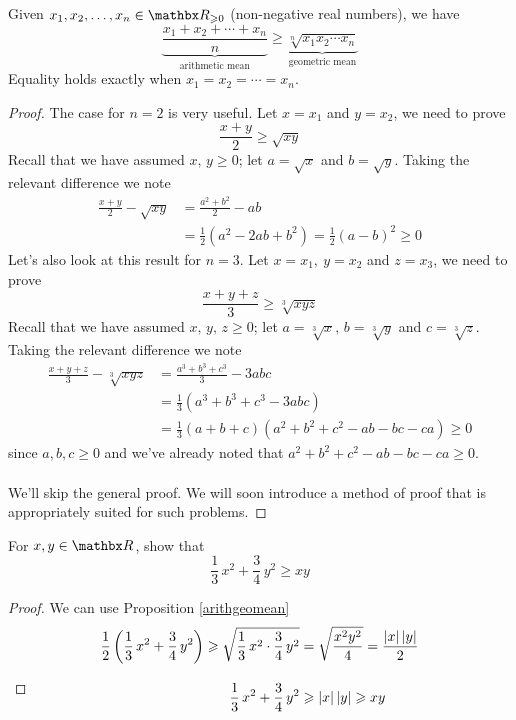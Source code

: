 \begin{proposition}[AM $\geq$ GM]\label{arithgeomean}
Given $x_1,x_2,\ldots,x_n \in \rr_{\geq 0}$ (non-negative real numbers), we have \[\underbrace{\frac{x_1 + x_2 + \cdots + x_n}{n}}_{\text{arithmetic mean}} \geq \underbrace{\sqrt[n]{x_1x_2\cdots x_n}}_{\text{geometric mean}}\]
Equality holds exactly when $x_1 = x_2 = \cdots = x_n$.
\end{proposition}
\begin{proof}
The case for $n = 2$ is very useful. Let $x = x_1$ and $y = x_2$, we need to prove
\[\frac{x+y}{2} \geq \sqrt{xy}\]
Recall that we have assumed $x,\,y \geq 0$; let $a = \sqrt{x}$ and $b = \sqrt{y}$. Taking the relevant difference we note
\begin{align*}
\frac{x+y}{2} - \sqrt{xy} &= \frac{a^2 + b^2}{2} - ab\\[0.5em]
 &= \frac{1}{2}\left(a^2  - 2ab + b^2\right) = \frac{1}{2}(a - b)^2 \geq 0
\end{align*}
Let's also look at this result for $n = 3$. Let $x = x_1,\ y = x_2$ and $z = x_3$, we need to prove
\[\frac{x+y+z}{3} \geq \sqrt[3]{xyz}\]
Recall that we have assumed $x,\,y,\,z \geq 0$; let $a = \sqrt[3]{x},\,b = \sqrt[3]{y}$ and $c = \sqrt[3]{z}$. Taking the relevant difference we note
\begin{align*}
\frac{x+y+z}{3} - \sqrt[3]{xyz} &= \frac{a^3 + b^3 + c^3}{3} - 3abc\\[0.5em]
 &= \frac{1}{3}\left(a^3 + b^3 + c^3  - 3abc\right)\\[0.5em]
 &= \frac{1}{3}(a + b + c)(a^2 + b^2 + c^2 - ab - bc - ca) \geq 0
\end{align*}
since $a,b,c \geq 0$ and we've already noted that $a^2 + b^2 + c^2 - ab - bc - ca \geq 0$.\\
\\
We'll skip the general proof. We will soon introduce a method of proof that is appropriately suited for such problems. 
\end{proof}

\vspace*{1em}

\begin{example}
For $x, y \in \rr$, show that
\[\frac{1}{3}\,x^2 + \frac{3}{4}\,y^2 \geq xy\]
\end{example}
\begin{proof}
We can use Proposition \ref{arithgeomean}
\begin{align*}
\frac{1}{2}\left(\frac{1}{3}\,x^2 + \frac{3}{4}\,y^2\right) \geqslant \sqrt{\frac{1}{3}\,x^2 \cdot \frac{3}{4}\,y^2} &= \sqrt{\frac{x^2y^2}{4}} = \frac{\left\lvert x\right\rvert\left\lvert y\right\rvert}{2}\\[1em]
\frac{1}{3}\,x^2 + \frac{3}{4}\,y^2 &\geqslant \left\lvert x\right\rvert\left\lvert y\right\rvert \geqslant xy\\[-3em]
\end{align*}
\end{proof}

